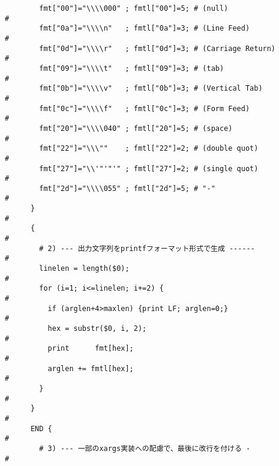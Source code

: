 \begin{frameboxit}{160.0mm}
\begin{verbatim}
	    fmt["00"]="\\\\000" ; fmtl["00"]=5; # (null)                          #
	    fmt["0a"]="\\\\n"   ; fmtl["0a"]=3; # (Line Feed)                     #
	    fmt["0d"]="\\\\r"   ; fmtl["0d"]=3; # (Carriage Return)               #
	    fmt["09"]="\\\\t"   ; fmtl["09"]=3; # (tab)                           #
	    fmt["0b"]="\\\\v"   ; fmtl["0b"]=3; # (Vertical Tab)                  #
	    fmt["0c"]="\\\\f"   ; fmtl["0c"]=3; # (Form Feed)                     #
	    fmt["20"]="\\\\040" ; fmtl["20"]=5; # (space)                         #
	    fmt["22"]="\\\""    ; fmtl["22"]=2; # (double quot)                   #
	    fmt["27"]="\\'"'"'" ; fmtl["27"]=2; # (single quot)                   #
	    fmt["2d"]="\\\\055" ; fmtl["2d"]=5; # "-"                             #
	  }                                                                       #
	  {                                                                       #
	    # 2) --- 出力文字列をprintfフォーマット形式で生成 ------                 #
	    linelen = length($0);                                                 #
	    for (i=1; i<=linelen; i+=2) {                                         #
	      if (arglen+4>maxlen) {print LF; arglen=0;}                          #
	      hex = substr($0, i, 2);                                             #
	      print      fmt[hex];                                                #
	      arglen += fmtl[hex];                                                #
	    }                                                                     #
	  }                                                                       #
	  END {                                                                   #
	    # 3) --- 一部のxargs実装への配慮で、最後に改行を付ける -                  #
\end{verbatim}
\end{frameboxit}


